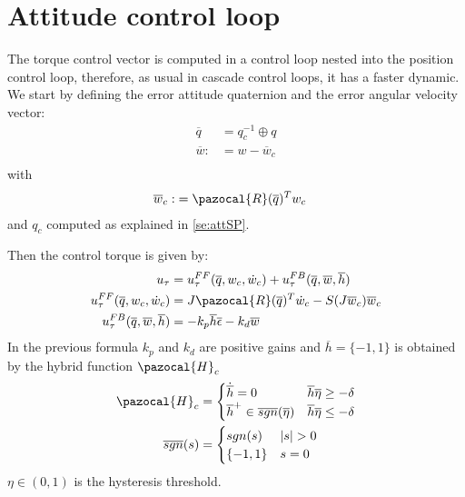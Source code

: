 \section{Attitude control loop}\label{sec:attControlLoop}
The torque control vector is computed in a control loop nested into the position control loop, therefore, as usual in cascade control loops, it has a faster dynamic.
We start by defining the error attitude quaternion and the error angular velocity vector:
\begin{equation} \label{eq:qerr}
\begin{split}
\overline{q}&=q_{c}^{-1}\oplus q\\
\overline{w}:&=w-\overline{w}_{c}\\
\end{split}
\end{equation}
with
\begin{equation}
\begin{split}
\overline{w}_{c}:&=\pazocal{R}(\overline{q})^{T}w_{c}
\end{split}
\end{equation}
and $q_{c}$ computed as explained in \autoref{se:attSP}.

Then the control torque is given by:
\begin{equation}
\begin{split}
u_{\tau}&=u_{\tau}^{FF}(\overline{q},w_{c},\dot{w}_{c})   + u_{\tau}^{FB}(\overline{q},\overline{w},\overline{h})\\
u_{\tau}^{FF}(\overline{q},w_{c},\dot{w}_{c})   &=  J\pazocal{R}(\overline{q})^{T}\dot{w}_{c}   - S(J\overline{w}_{c}) \overline{w}_{c}\\
u_{\tau}^{FB}(\overline{q},\overline{w},\overline{h})   &=  -k_{p}\overline{h}\overline{\epsilon}  -k_{d}\overline{w}
\end{split}
\end{equation}
In the previous formula $k_{p}$ and $k_{d}$ are positive gains and $\overline{h} = \{-1,1\}$ is obtained by the hybrid function $\pazocal{H}_{c}$
\begin{equation}
\begin{split}
\pazocal{H}_{c} &= \begin{cases} \dot{\overline{h}} = 0  & \overline{h}\overline{\eta} \geq -\delta \\ \overline{h}^{+} \in \overline{sgn}(\overline{\eta}) & \overline{h}\overline{\eta} \leq -\delta  \end{cases}\\
\overline{sgn}(s) &= \begin{cases} sgn(s)  & \lvert s \rvert > 0 \\ \{-1,1\} &  s=0 \end{cases}\\
\end{split}
\end{equation}
$\eta \in (0,1)$ is the hysteresis threshold.\\

